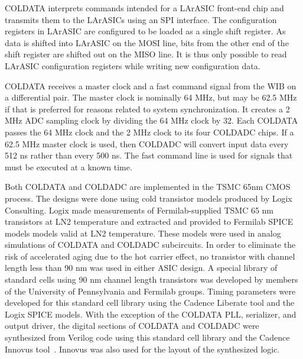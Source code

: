 COLDATA interprets commands intended for a LArASIC front-end chip and transmits them to the LArASICs using an SPI\cite{SPI} interface.  The configuration registers in LArASIC are configured to be loaded as a single shift register.  As data is shifted into LArASIC on the MOSI line, bits from the other end of the shift register are shifted out on the MISO line.  It is thus only possible to read LArASIC configuration registers while writing new configuration data.

COLDATA receives a master clock and a fast command signal from the WIB on a differential pair.  The master clock is nominally 64 MHz, but may be 62.5 MHz if that is preferred for reasons related to system synchronization.  It creates a 2 MHz ADC sampling clock by dividing the 64 MHz clock by 32.  Each COLDATA passes the 64 MHz clock and the 2 MHz clock to its four COLDADC chips.  If a 62.5 MHz master clock is used, then COLDADC will convert input data every 512 ns rather than every 500 ns.  The fast command line is used for signals that must be executed at a known time.

Both COLDATA and COLDADC are implemented in the TSMC 65nm CMOS process.\cite{TSMC65} The designs were done using cold transistor models produced by Logix Consulting.\cite{Logix} Logix made measurements of Fermilab-supplied TSMC 65 nm transistors at LN2 temperature and extracted and provided to Fermilab SPICE \cite{SPICE} models models valid at LN2 temperature.  These models were used in analog simulations of COLDATA and COLDADC subcircuits.  In order to eliminate the risk of accelerated aging due to the hot carrier effect,\cite{Hot-electron} no transistor with channel length less than 90 nm was used in either ASIC design.  A special library of standard cells using 90 nm channel length transistors was developed by members of the University of Pennsylvania and Fermilab groups.  Timing parameters were developed for this standard cell library using the Cadence Liberate tool\cite{Liberate} and the Logix SPICE models.  With the exception of the COLDATA PLL, serializer, and output driver, the digital sections of COLDATA and COLDADC were synthesized from Verilog code using this standard cell library and the Cadence Innovus tool~\cite{Innovus}. Innovus was also used for the layout of the synthesized logic.


